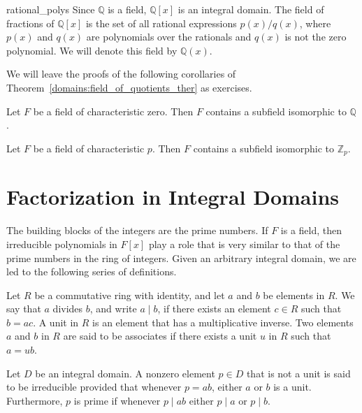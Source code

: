 \begin{example}{rational_polys}
Since ${\mathbb Q}$ is a field, ${\mathbb Q}[x]$ is an integral domain. The
field of fractions of ${\mathbb Q}[x]$ is the set of all rational
expressions $p(x)/q(x)$, where $p(x)$ and $q(x)$ are polynomials over
the rationals and $q(x)$ is not the zero polynomial. We will denote 
this field by ${\mathbb Q}(x)$.\label{noteratpoly} 
\end{example}

 

We will leave the proofs of the following corollaries of Theorem~\ref{domains:field_of_quotients_ther}
as exercises. 
 

\begin{corollary}\label{domains:char_zero_rationals_corollary}
Let $F$ be a field of characteristic zero. Then $F$ contains a
subfield isomorphic to ${\mathbb Q}$.	       
\end{corollary}


\begin{corollary}\label{domains:char_p_Zp_corollary}
Let $F$ be a field of characteristic $p$. Then $F$ contains a
subfield isomorphic to ${\mathbb Z}_p$.	       
\end{corollary}
 


\section{Factorization in Integral Domains}

 
The building blocks of the integers are the prime numbers.  If $F$ is
a field, then irreducible polynomials in $F[x]$ play a role that is
very similar to that of the prime numbers in the ring of integers.
Given an arbitrary integral domain, we are led to the following
series of definitions. 
 

Let $R$ be a commutative ring with identity, and let $a$ and $b$ be
elements in $R$.  We say that $a$ {\bfi divides} $b$, and write $a \mid
b$, if there exists an element $c \in R$ such that $b = ac$.  A {\bfi
unit\/} in $R$ is an element that has a multiplicative
inverse.  Two elements $a$ and $b$ in $R$ are said to be {\bfi
associates\/} if
there exists a unit $u$ in $R$ such that $a = ub$.   
 

Let $D$ be an integral domain.  A nonzero element $p \in D$ that is
not a unit is said to be {\bfi
irreducible\/}
provided that whenever $p = ab$, either $a$ or $b$ is a unit.
Furthermore, $p$ is {\bfi
prime\/} if whenever $p \mid
ab$ either $p \mid a$ or $p \mid b$.


